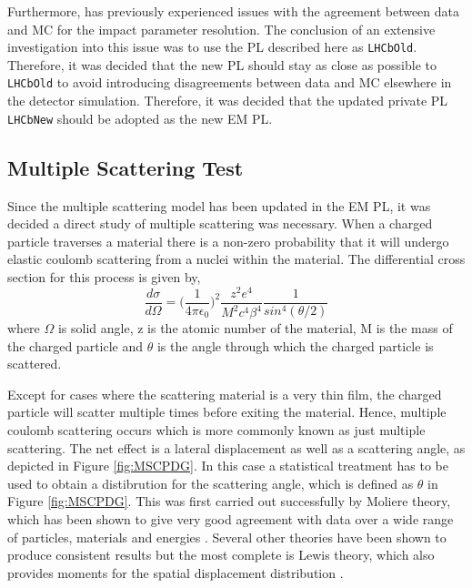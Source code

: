 Furthermore, \lhcb has previously experienced issues with the agreement between data and MC for the impact parameter resolution.  The conclusion of an extensive investigation into this issue was to use the PL described here as \texttt{LHCbOld}.  Therefore, it was decided that the new PL should stay as close as possible to \texttt{LHCbOld} to avoid introducing disagreements between data and MC elsewhere in the detector simulation.  Therefore, it was decided that the updated \lhcb private PL \texttt{LHCbNew} should be adopted as the new EM PL.





\clearpage

\subsection{Multiple Scattering Test}
\label{sec:Multiple Scattering Test}
Since the multiple scattering model has been updated in the EM PL, it was decided a direct study of multiple scattering was necessary.  When a charged particle traverses a material there is a non-zero probability that it will undergo elastic coulomb scattering from a nuclei within the material.  The differential cross section for this process is given by,
\begin{equation}
  \label{eq:Rutherford}
  \frac{d\sigma}{d\Omega}=\big(\frac{1}{4\pi\epsilon_0}\big)^2\frac{z^2e^4}{M^2c^4\beta^4}\frac{1}{sin^4(\theta/2)}
  \end{equation}
where $\Omega$ is solid angle, z is the atomic number of the material, M is the mass of the charged particle and $\theta$ is the angle through which the charged particle is scattered\cite{eisberg1974quantum}.

Except for cases where the scattering material is a very thin film, the charged particle will scatter multiple times before exiting the material.  Hence, multiple coulomb scattering occurs which is more commonly known as just multiple scattering. The net effect is a lateral displacement as well as a scattering angle, as depicted in Figure \ref{fig:MSCPDG}.  In this case a statistical treatment has to be used to obtain a distibrution for the scattering angle, which is defined as $\theta$ in Figure \ref{fig:MSCPDG}. This was first carried out successfully by Moliere theory, which has been shown to give very good agreement with data over a wide range of particles, materials and energies \cite{PhysRev.89.1256,Gottschalk1993467}.  Several other theories have been shown to produce consistent results but the most complete is Lewis theory, which also provides moments for the spatial displacement distribution \cite{PhysRev.78.526}.

